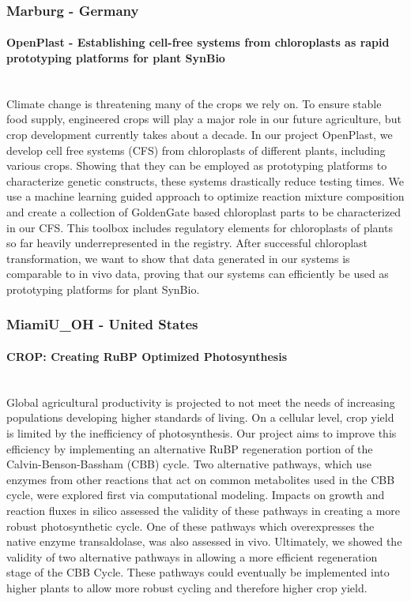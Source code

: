\subsubsection*{Marburg - Germany}
\paragraph{OpenPlast - Establishing cell-free systems from chloroplasts as rapid prototyping platforms for plant SynBio}\mbox{} \\
Climate change is threatening many of the crops we rely on. To ensure stable food supply, engineered crops will play a major role in our future agriculture, but crop development currently takes about a decade. In our project OpenPlast, we develop cell free systems (CFS) from chloroplasts of different plants, including various crops. Showing that they can be employed as prototyping platforms to characterize genetic constructs, these systems drastically reduce testing times. We use a machine learning guided approach to optimize reaction mixture composition and create a collection of GoldenGate based chloroplast parts to be characterized in our CFS. This toolbox includes regulatory elements for chloroplasts of plants so far heavily underrepresented in the registry. After successful chloroplast transformation, we want to show that data generated in our systems is comparable to in vivo data, proving that our systems can efficiently be used as prototyping platforms for plant SynBio.

\subsubsection*{MiamiU\_OH - United States}
\paragraph{CROP: Creating RuBP Optimized Photosynthesis}\mbox{} \\
Global agricultural productivity is projected to not meet the needs of increasing populations developing higher standards of living. On a cellular level, crop yield is limited by the inefficiency of photosynthesis. Our project aims to improve this efficiency by implementing an alternative RuBP regeneration portion of the Calvin-Benson-Bassham (CBB) cycle. Two alternative pathways, which use enzymes from other reactions that act on common metabolites used in the CBB cycle, were explored first via computational modeling. Impacts on growth and reaction fluxes in silico assessed the validity of these pathways in creating a more robust photosynthetic cycle. One of these pathways which overexpresses the native enzyme transaldolase, was also assessed in vivo. Ultimately, we showed the validity of two alternative pathways in allowing a more efficient regeneration stage of the CBB Cycle. These pathways could eventually be implemented into higher plants to allow more robust cycling and therefore higher crop yield.
\pagebreak
